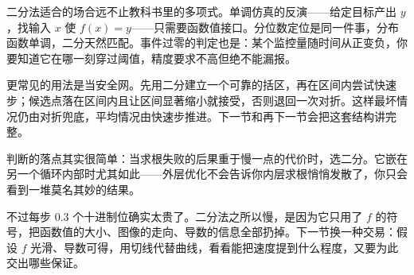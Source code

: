二分法适合的场合远不止教科书里的多项式。单调仿真的反演——给定目标产出 \(y\)，找输入 \(x\) 使 \(f(x)=y\)——只需要函数值接口。分位数定位是同一件事，分布函数单调，二分天然匹配。事件过零的判定也是：某个监控量随时间从正变负，你要知道它在哪一刻穿过阈值，精度要求不高但绝不能漏报。

更常见的用法是当安全网。先用二分建立一个可靠的括区，再在区间内尝试快速步；候选点落在区间内且让区间显著缩小就接受，否则退回一次对折。这样最坏情况仍由对折兜底，平均情况由快速步推进。下一节和再下一节会把这套结构讲完整。

判断的落点其实很简单：当求根失败的后果重于慢一点的代价时，选二分。它嵌在另一个循环内部时尤其如此——外层优化不会告诉你内层求根悄悄发散了，你只会看到一堆莫名其妙的结果。

不过每步 \(0.3\) 个十进制位确实太贵了。二分法之所以慢，是因为它只用了 \(f\) 的符号，把函数值的大小、图像的走向、导数的信息全部扔掉。下一节换一种交易：假设 \(f\) 光滑、导数可得，用切线代替曲线，看看能把速度提到什么程度，又要为此交出哪些保证。
